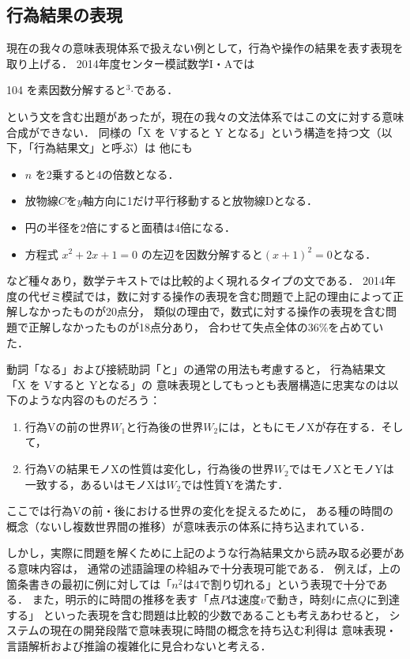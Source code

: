 \documentclass[japanese]{jnlp_1.4b}
\begin{document}
\subsection{行為結果の表現}

現在の我々の意味表現体系で扱えない例として，行為や操作の結果を表す表現を取り上げる．
2014年度センター模試数学I・Aでは
\begin{center}
    104 を素因数分解すると{\setlength{\fboxsep}{0cm}}$^3$$\cdot${\setlength{\fboxsep}{0cm}}である．
\end{center}
という文を含む出題があったが，現在の我々の文法体系ではこの文に対する意味合成ができない．
同様の「X を Vすると Y となる」という構造を持つ文（以下，「行為結果文」と呼ぶ）は
他にも
\begin{itemize}
    \item $n$ を2乗すると4の倍数となる．
    \item 放物線$C$を$y$軸方向に1だけ平行移動すると放物線Dとなる．
    \item 円の半径を2倍にすると面積は4倍になる．
    \item 方程式 $x^2+2x+1=0$ の左辺を因数分解すると$(x+1)^2=0$となる．
\end{itemize}
など種々あり，数学テキストでは比較的よく現れるタイプの文である．
2014年度の代ゼミ模試では，数に対する操作の表現を含む問題で上記の理由によって正解しなかったものが20点分，
類似の理由で，数式に対する操作の表現を含む問題で正解しなかったものが18点分あり，
合わせて失点全体の36\%を占めていた．

動詞「なる」および接続助詞「と」の通常の用法も考慮すると，
行為結果文「X を Vすると Yとなる」の
意味表現としてもっとも表層構造に忠実なのは以下のような内容のものだろう：
\begin{enumerate}
    \item 行為Vの前の世界$W_1$と行為後の世界$W_2$には，ともにモノXが存在する．そして，
    \item 行為Vの結果モノXの性質は変化し，行為後の世界$W_2$ではモノXとモノYは一致する，あるいはモノXは$W_2$では性質Yを満たす．
\end{enumerate}
ここでは行為Vの前・後における世界の変化を捉えるために，
ある種の時間の概念（ないし複数世界間の推移）が意味表示の体系に持ち込まれている．


しかし，実際に問題を解くために上記のような行為結果文から読み取る必要がある意味内容は，
通常の述語論理の枠組みで十分表現可能である．
例えば，上の箇条書きの最初に例に対しては「$n^2$は4で割り切れる」という表現で十分である．
また，明示的に時間の推移を表す「点$P$は速度$v$で動き，時刻$t$に点$Q$に到達する」
といった表現を含む問題は比較的少数であることも考えあわせると，
システムの現在の開発段階で意味表現に時間の概念を持ち込む利得は
意味表現・言語解析および推論の複雑化に見合わないと考える．
\end{document}
